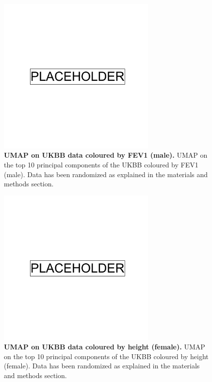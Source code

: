 \newpage

\begin{figure}[ht]
    \centering
    \includegraphics[width=0.7\textwidth]{placeholder.png}
    \caption[UMAP on UKBB data coloured by FEV1 (male)]{\textbf{UMAP on UKBB data coloured by FEV1 (male).} UMAP on the top 10 principal components of the UKBB coloured by FEV1 (male). Data has been randomized as explained in the materials and methods section.}
    \label{fig:supp_ukbb_fev_m}
\end{figure}

\newpage

\begin{figure}[ht]
    \centering
    \includegraphics[width=0.7\textwidth]{placeholder.png}
    \caption[UMAP on UKBB data coloured by height (female)]{\textbf{UMAP on UKBB data coloured by height (female).} UMAP on the top 10 principal components of the UKBB coloured by height (female). Data has been randomized as explained in the materials and methods section.}
    \label{fig:supp_ukbb_height_f}
\end{figure}

